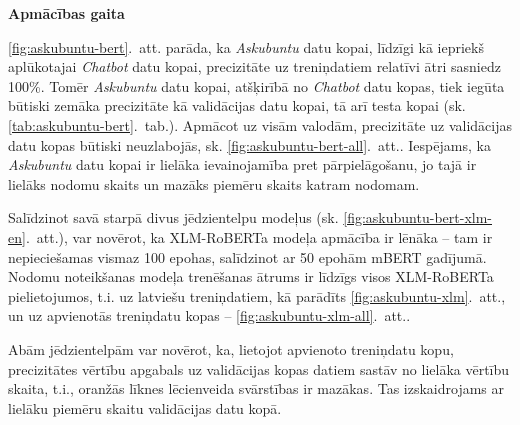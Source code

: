 \textbf{Apmācības gaita}

\ref{fig:askubuntu-bert}.~att. parāda, ka \textit{Askubuntu} datu kopai, līdzīgi kā iepriekš aplūkotajai \textit{Chatbot} datu kopai, precizitāte uz treniņdatiem relatīvi ātri sasniedz 100\%. 
Tomēr \textit{Askubuntu} datu kopai, atšķirībā no \textit{Chatbot} datu kopas, tiek iegūta būtiski zemāka precizitāte kā validācijas datu kopai, tā arī testa kopai (sk. \ref{tab:askubuntu-bert}.~tab.).
Apmācot uz visām valodām, precizitāte uz validācijas datu kopas būtiski neuzlabojās, sk. \ref{fig:askubuntu-bert-all}.~att..
Iespējams, ka \textit{Askubuntu} datu kopai ir lielāka ievainojamība pret pārpielāgošanu, jo tajā ir lielāks nodomu skaits un mazāks piemēru skaits katram nodomam.

Salīdzinot savā starpā divus jēdzientelpu modeļus (sk. \ref{fig:askubuntu-bert-xlm-en}.~att.), var novērot, ka XLM-RoBERTa modeļa apmācība ir lēnāka -- tam ir nepieciešamas vismaz 100 epohas, salīdzinot ar 50 epohām mBERT gadījumā.
Nodomu noteikšanas modeļa trenēšanas ātrums ir līdzīgs visos XLM-RoBERTa pielietojumos, t.i. uz latviešu treniņdatiem, kā parādīts \ref{fig:askubuntu-xlm}.~att., un uz apvienotās treniņdatu kopas -- \ref{fig:askubuntu-xlm-all}.~att..

Abām jēdzientelpām var novērot, ka, lietojot apvienoto treniņdatu kopu, precizitātes vērtību apgabals uz validācijas kopas datiem sastāv no lielāka vērtību skaita, t.i., oranžās līknes lēcienveida svārstības ir mazākas.
Tas izskaidrojams ar lielāku piemēru skaitu validācijas datu kopā.




